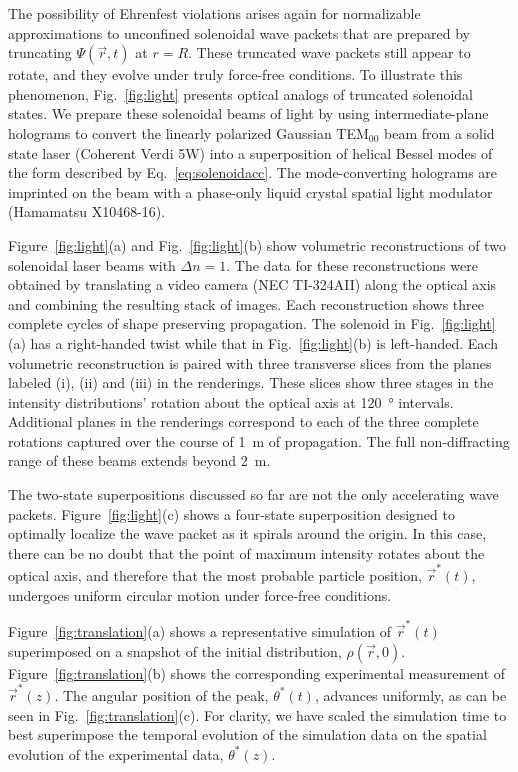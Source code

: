 The possibility of Ehrenfest violations arises again
for normalizable approximations to unconfined
solenoidal wave packets that are prepared by truncating
$\Psi(\vec{r},t)$ at $r = R$.
These truncated wave packets still appear to rotate,
and they evolve under truly force-free conditions.
To illustrate this phenomenon, Fig.~\ref{fig:light}
presents optical analogs of truncated solenoidal states.
We prepare these solenoidal beams of light
by using intermediate-plane holograms \cite{mondal18}
to convert the linearly polarized
Gaussian TEM$_{00}$ beam from
a solid state laser (Coherent Verdi 5W) into a superposition
of helical Bessel modes of the form described by
Eq.~\eqref{eq:solenoidacc}.
The mode-converting holograms are imprinted
on the beam with a phase-only liquid crystal 
spatial light modulator (Hamamatsu X10468-16).

Figure~\ref{fig:light}(a) and Fig.~\ref{fig:light}(b)
show volumetric reconstructions of two
solenoidal laser beams with $\Delta n = 1$.
The data for these reconstructions
were obtained by translating a video camera 
(NEC TI-324AII) along the optical axis and
combining the resulting stack of images.
Each reconstruction shows three complete cycles of shape preserving
propagation.
The solenoid in Fig.~\ref{fig:light}(a) has a right-handed twist
while that in Fig.~\ref{fig:light}(b) is left-handed.
Each volumetric reconstruction is paired with three
transverse slices from the planes labeled
(i), (ii) and (iii) in the renderings.
These slices show three stages in the
intensity distributions' rotation about the optical axis at
\SI{120}{\degree} intervals.
Additional planes in the renderings
correspond to each of the three complete rotations
captured over the
course of \SI{1}{\meter} of propagation.  The full non-diffracting
range of these beams extends beyond \SI{2}{\meter}.

The two-state superpositions discussed so far are not
the only accelerating wave packets.
Figure~\ref{fig:light}(c) shows a four-state superposition
designed to optimally localize the wave packet as it spirals
around the origin.
In this case, there can be no doubt that the point of
maximum intensity rotates about the 
optical axis, and therefore that
the most probable particle position,
$\vec{r}^\ast(t)$, undergoes uniform
circular motion under force-free conditions.

Figure~\ref{fig:translation}(a)
shows a representative simulation of
$\vec{r}^\ast(t)$ superimposed on a snapshot
of the initial distribution, $\rho(\vec{r},0)$.
Figure~\ref{fig:translation}(b) shows the corresponding
experimental measurement of $\vec{r}^\ast(z)$.
The angular position of the peak, $\theta^\ast(t)$,
advances uniformly, as can be seen in Fig.~\ref{fig:translation}(c).
For clarity, we have scaled the simulation time to best
superimpose the temporal evolution of the simulation
data on the spatial evolution of the experimental data, $\theta^\ast(z)$.

